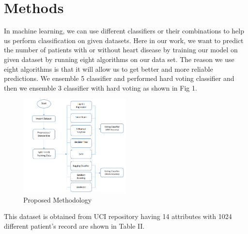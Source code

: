 \documentclass[journal, twoside, final]{IEEEtran}
\begin{document}
\section{Methods}
In machine learning, we can use different classifiers or their combinations to help us perform classification on given datasets. Here in our work, we want to predict the number of patients with or without heart disease by training our model on given dataset by running eight algorithms on our data set. The reason we use eight algorithms is that it will allow us to get better and more reliable predictions. We ensemble 5 classifier and performed hard voting classifier and then we ensemble 3 classifier with hard voting as shown in Fig 1.
\begin{figure}[htbp]
  \centering
  \includegraphics[width=0.5\textwidth]{flowchart.png} %
  \captionsetup{justification=centering}
  \caption{Proposed Methodology}
\end{figure}


This dataset is obtained from UCI repository having 14 attributes with 1024 different patient’s record are shown in Table II. 
\end{document}
